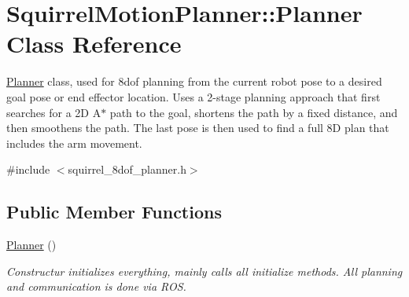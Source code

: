 \hypertarget{classSquirrelMotionPlanner_1_1Planner}{\section{Squirrel\-Motion\-Planner\-:\-:Planner Class Reference}
\label{classSquirrelMotionPlanner_1_1Planner}
}


\hyperlink{classSquirrelMotionPlanner_1_1Planner}{Planner} class, used for 8dof planning from the current robot pose to a desired goal pose or end effector location. Uses a 2-\/stage planning approach that first searches for a 2\-D A$\ast$ path to the goal, shortens the path by a fixed distance, and then smoothens the path. The last pose is then used to find a full 8\-D plan that includes the arm movement.  




{\ttfamily \#include $<$squirrel\-\_\-8dof\-\_\-planner.\-h$>$}

\subsection*{Public Member Functions}
\begin{DoxyCompactItemize}
\item 
\hypertarget{classSquirrelMotionPlanner_1_1Planner_a37ec9eb4651a26d956e8226e2b6e435b}{\hyperlink{classSquirrelMotionPlanner_1_1Planner_a37ec9eb4651a26d956e8226e2b6e435b}{Planner} ()}\label{classSquirrelMotionPlanner_1_1Planner_a37ec9eb4651a26d956e8226e2b6e435b}

\begin{DoxyCompactList}\small\item\em Constructur initializes everything, mainly calls all initialize methods. All planning and communication is done via R\-O\-S. \end{DoxyCompactList}\end{DoxyCompactItemize}

